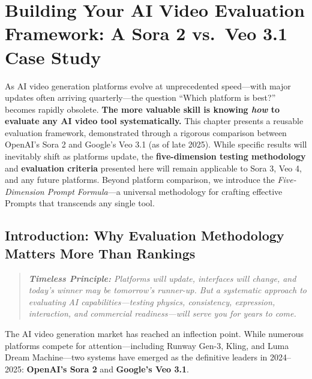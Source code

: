 \chapter{Building Your AI Video Evaluation Framework: A Sora 2 vs.\ Veo 3.1 Case Study}
\label{ch:sora-veo-comparison}

\begin{chapterabstract}
As AI video generation platforms evolve at unprecedented speed---with major updates often arriving quarterly---the question ``Which platform is best?'' becomes rapidly obsolete. \textbf{The more valuable skill is knowing \textit{how} to evaluate any AI video tool systematically.} This chapter presents a reusable evaluation framework, demonstrated through a rigorous comparison between OpenAI's Sora 2 and Google's Veo 3.1 (as of late 2025). While specific results will inevitably shift as platforms update, the \textbf{five-dimension testing methodology} and \textbf{evaluation criteria} presented here will remain applicable to Sora 3, Veo 4, and any future platforms. Beyond platform comparison, we introduce the \textit{Five-Dimension Prompt Formula}---a universal methodology for crafting effective Prompts that transcends any single tool.
\end{chapterabstract}

\section{Introduction: Why Evaluation Methodology Matters More Than Rankings}
\label{sec:comparison-intro}

\begin{quote}
\textit{\textbf{Timeless Principle:} Platforms will update, interfaces will change, and today's winner may be tomorrow's runner-up. But a systematic approach to evaluating AI capabilities---testing physics, consistency, expression, interaction, and commercial readiness---will serve you for years to come.}
\end{quote}

The AI video generation market has reached an inflection point. While numerous platforms compete for attention---including Runway Gen-3, Kling, and Luma Dream Machine---two systems have emerged as the definitive leaders in 2024--2025: \textbf{OpenAI's Sora 2} and \textbf{Google's Veo 3.1}.

